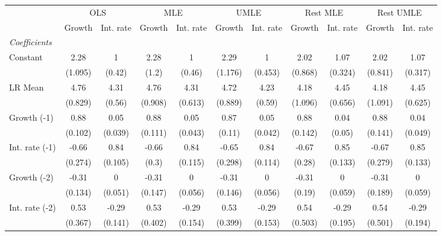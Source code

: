 \begin{table}[htbp] 
	\centering
	\begin{tabular}{@{\extracolsep{4pt}}lcccccccccc@{}}		\hline\hline
		 		 & \multicolumn{2}{c}{OLS} &\multicolumn{2}{c}{MLE} &\multicolumn{2}{c}{UMLE} &\multicolumn{2}{c}{Rest MLE} &\multicolumn{2}{c}{Rest UMLE} \\ 
 		 & Growth 	 & Int. rate 	 & Growth 	 & Int. rate 	 & Growth 	 & Int. rate 	 & Growth 	 & Int. rate 	 & Growth 	 & Int. rate\\\cline{2-3}\cline{4-5}\cline{6-7}\cline{8-9}\cline{10-11}
\rule{0pt}{4ex} 
 \emph{Coefficients} 	  		 & 		 & 		 & 		 & 		 & 		 & 		 & 		 & 		 & 		 &\\ 
\quad Constant 	 & 2.28 	 & 1 	 & 2.28 	 & 1 	 & 2.29 	 & 1 	 & 2.02 	 & 1.07 	 & 2.02 	 & 1.07	 \\ 
 		 & (1.095) 	 & (0.42) 	 & (1.2) 	 & (0.46) 	 & (1.176) 	 & (0.453) 	 & (0.868) 	 & (0.324) 	 & (0.841) 	 & (0.317) 	 \\ 
\quad LR Mean 	 & 4.76 	 & 4.31 	 & 4.76 	 & 4.31 	 & 4.72 	 & 4.23 	 & 4.18 	 & 4.45 	 & 4.18 	 & 4.45	 \\ 
 		 & (0.829) 	 & (0.56) 	 & (0.908) 	 & (0.613) 	 & (0.889) 	 & (0.59) 	 & (1.096) 	 & (0.656) 	 & (1.091) 	 & (0.625) 	 \\ 
\quad Growth (-1) 	 &0.88 	 & 0.05 	 & 0.88 	 & 0.05 	 & 0.87 	 & 0.05 	 & 0.88 	 & 0.04 	 & 0.88 	 & 0.04	 \\ 
 		 & (0.102) 	 & (0.039) 	 & (0.111) 	 & (0.043) 	 & (0.11) 	 & (0.042) 	 & (0.142) 	 & (0.05) 	 & (0.141) 	 & (0.049) 	 \\ 
\quad Int. rate (-1) 	 &-0.66 	 & 0.84 	 & -0.66 	 & 0.84 	 & -0.65 	 & 0.84 	 & -0.67 	 & 0.85 	 & -0.67 	 & 0.85	 \\ 
 		 & (0.274) 	 & (0.105) 	 & (0.3) 	 & (0.115) 	 & (0.298) 	 & (0.114) 	 & (0.28) 	 & (0.133) 	 & (0.279) 	 & (0.133) 	 \\ 
\quad Growth (-2) 	 &-0.31 	 & 0 	 & -0.31 	 & 0 	 & -0.31 	 & 0 	 & -0.31 	 & 0 	 & -0.31 	 & 0	 \\ 
 		 & (0.134) 	 & (0.051) 	 & (0.147) 	 & (0.056) 	 & (0.146) 	 & (0.056) 	 & (0.19) 	 & (0.059) 	 & (0.189) 	 & (0.059) 	 \\ 
\quad Int. rate (-2) 	 &0.53 	 & -0.29 	 & 0.53 	 & -0.29 	 & 0.53 	 & -0.29 	 & 0.54 	 & -0.29 	 & 0.54 	 & -0.29	 \\ 
 		 & (0.367) 	 & (0.141) 	 & (0.402) 	 & (0.154) 	 & (0.399) 	 & (0.153) 	 & (0.503) 	 & (0.195) 	 & (0.501) 	 & (0.194) 	 \\ 

\end{tabular}
\end{table}
